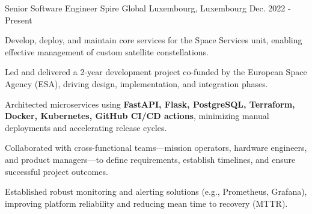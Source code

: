 
\begin{cventries}

  \cventry
  {Senior Software Engineer} %
  {Spire Global} %
  {Luxembourg, Luxembourg} %
  {Dec. 2022 - Present} %
  {
    \begin{cvitems}
      \item {Develop, deploy, and maintain core services for the Space Services unit, enabling effective management of custom satellite constellations.}
      \item {Led and delivered a 2-year development project co-funded by the European Space Agency (ESA), driving design, implementation, and integration phases.}
      \item {Architected microservices using \textbf{FastAPI, Flask, PostgreSQL, Terraform, Docker, Kubernetes, GitHub CI/CD actions}, minimizing manual deployments and accelerating release cycles.}
      \item {Collaborated with cross-functional teams—mission operators, hardware engineers, and product managers—to define requirements, establish timelines, and ensure successful project outcomes.}
      \item {Established robust monitoring and alerting solutions (e.g., Prometheus, Grafana), improving platform reliability and reducing mean time to recovery (MTTR).}
    \end{cvitems}
  }


\end{cventries}
